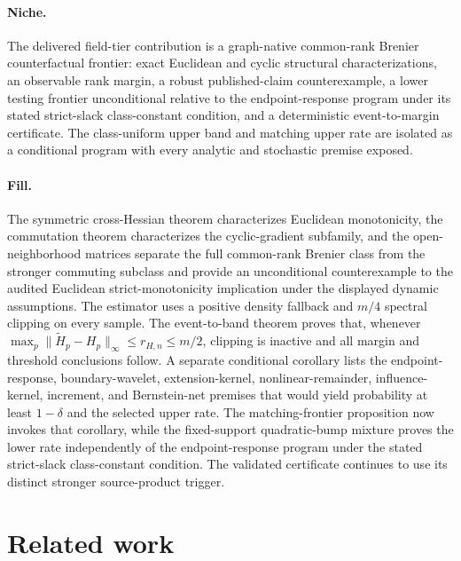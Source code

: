 \documentclass{article}
\begin{document}
\paragraph{Niche.} The delivered field-tier contribution is a graph-native common-rank Brenier counterfactual frontier: exact Euclidean and cyclic structural characterizations, an observable rank margin, a robust published-claim counterexample, a lower testing frontier unconditional relative to the endpoint-response program under its stated strict-slack class-constant condition, and a deterministic event-to-margin certificate. The class-uniform upper band and matching upper rate are isolated as a conditional program with every analytic and stochastic premise exposed.

\paragraph{Fill.} The symmetric cross-Hessian theorem characterizes Euclidean monotonicity, the commutation theorem characterizes the cyclic-gradient subfamily, and the open-neighborhood matrices separate the full common-rank Brenier class from the stronger commuting subclass and provide an unconditional counterexample to the audited Euclidean strict-monotonicity implication under the displayed dynamic assumptions. The estimator uses a positive density fallback and \(m/4\) spectral clipping on every sample. The event-to-band theorem proves that, whenever \(\max_p\lVert\widetilde H_p-H_p\rVert_\infty\le r_{H,n}\le m/2\), clipping is inactive and all margin and threshold conclusions follow. A separate conditional corollary lists the endpoint-response, boundary-wavelet, extension-kernel, nonlinear-remainder, influence-kernel, increment, and Bernstein-net premises that would yield probability at least \(1-\delta\) and the selected upper rate. The matching-frontier proposition now invokes that corollary, while the fixed-support quadratic-bump mixture proves the lower rate independently of the endpoint-response program under the stated strict-slack class-constant condition. The validated certificate continues to use its distinct stronger source-product trigger.

\section{Related work}
\end{document}
